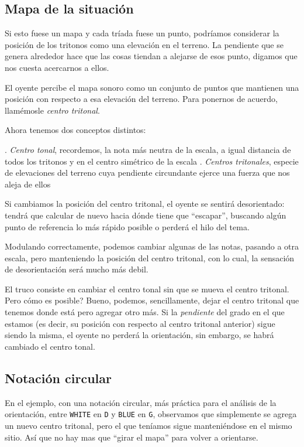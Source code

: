 \documentclass[]{article}
\begin{document}
\subsection{Mapa de la situación}

Si esto fuese un mapa y cada tríada fuese un punto, podríamos considerar la posición de los tritonos como una elevación en el terreno. La pendiente que se genera alrededor hace que las cosas tiendan a alejarse de esos punto, digamos que nos cuesta acercarnos a ellos.

El oyente percibe el mapa sonoro como un conjunto de puntos que mantienen una posición con respecto a esa elevación del terreno. Para ponernos de acuerdo, llamémosle \emph{centro tritonal}.

Ahora tenemos dos conceptos distintos:

. \emph{Centro tonal}, recordemos, la nota más neutra de la escala, a igual distancia de todos los tritonos y en el centro simétrico de la escala . \emph{Centros tritonales}, especie de elevaciones del terreno cuya pendiente circundante ejerce una fuerza que nos aleja de ellos

Si cambiamos la posición del centro tritonal, el oyente se sentirá desorientado: tendrá que calcular de nuevo hacia dónde tiene que ``escapar'', buscando algún punto de referencia lo más rápido posible o perderá el hilo del tema.

Modulando correctamente, podemos cambiar algunas de las notas, pasando a otra escala, pero manteniendo la posición del centro tritonal, con lo cual, la sensación de desorientación será mucho más debil.

El truco consiste en cambiar el centro tonal sin que se mueva el centro tritonal. Pero cómo es posible? Bueno, podemos, sencillamente, dejar el centro tritonal que tenemos donde está pero agregar otro más. Si la \emph{pendiente} del grado en el que estamos (es decir, su posición con respecto al centro tritonal anterior) sigue siendo la misma, el oyente no perderá la orientación, sin embargo, se habrá cambiado el centro tonal.

\subsection{Notación circular}

 
En el ejemplo, con una notación circular, más práctica para el análisis de la orientación, entre \texttt{WHITE} en \texttt{D} y \texttt{BLUE} en \texttt{G}, observamos que simplemente se agrega un nuevo centro tritonal, pero el que teníamos sigue manteniéndose en el mismo sitio. Así que no hay mas que ``girar el mapa'' para volver a orientarse.
\end{document}
